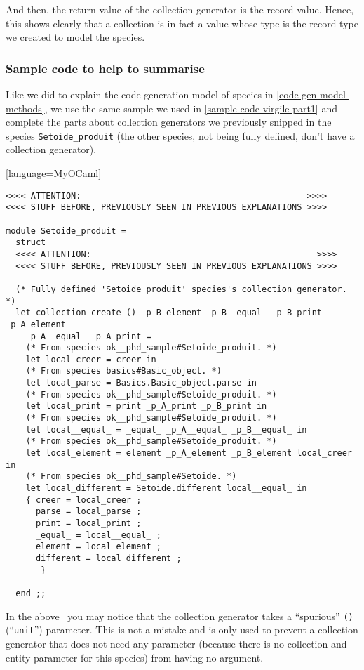 And then, the return value of the collection generator is the record
value. Hence, this shows clearly that a collection is in fact a value
whose type is the record type we created to model the species.


\subsubsection{Sample code to help to summarise}
Like we did to explain the code generation model of species in
\ref{code-gen-model-methods}, we use the same sample we used in
\ref{sample-code-virgile-part1} and complete the parts about
collection generators we previously snipped in the species
{\tt Setoide\_produit} (the other species, not being fully defined,
don't have a collection generator).

{\footnotesize[language=MyOCaml]
\begin{lstlisting}
<<<< ATTENTION:                                             >>>>
<<<< STUFF BEFORE, PREVIOUSLY SEEN IN PREVIOUS EXPLANATIONS >>>>

module Setoide_produit =
  struct
  <<<< ATTENTION:                                             >>>>
  <<<< STUFF BEFORE, PREVIOUSLY SEEN IN PREVIOUS EXPLANATIONS >>>>

  (* Fully defined 'Setoide_produit' species's collection generator. *)
  let collection_create () _p_B_element _p_B__equal_ _p_B_print _p_A_element
    _p_A__equal_ _p_A_print =
    (* From species ok__phd_sample#Setoide_produit. *)
    let local_creer = creer in
    (* From species basics#Basic_object. *)
    let local_parse = Basics.Basic_object.parse in
    (* From species ok__phd_sample#Setoide_produit. *)
    let local_print = print _p_A_print _p_B_print in
    (* From species ok__phd_sample#Setoide_produit. *)
    let local__equal_ = _equal_ _p_A__equal_ _p_B__equal_ in
    (* From species ok__phd_sample#Setoide_produit. *)
    let local_element = element _p_A_element _p_B_element local_creer in
    (* From species ok__phd_sample#Setoide. *)
    let local_different = Setoide.different local__equal_ in
    { creer = local_creer ;
      parse = local_parse ;
      print = local_print ;
      _equal_ = local__equal_ ;
      element = local_element ;
      different = local_different ;
       }
    
  end ;;
\end{lstlisting}
}

\label{point-the-extra-unit-parameter-need}
In the above \ocaml\ you may notice that the collection generator
takes a ``spurious'' {\tt ()} (``{\tt unit}'') parameter. This is not
a mistake and is only used to prevent a collection generator that does
not need any parameter (because there is no collection and entity
parameter for this species) from having no argument.

